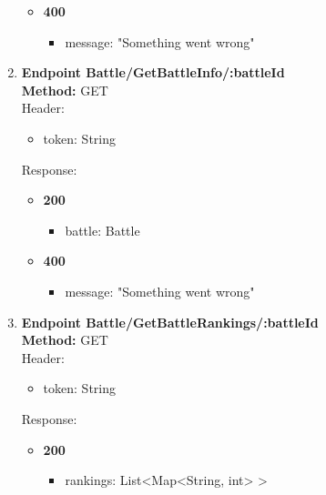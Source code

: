 \begin{enumerate}
\begin{itemize}
\begin{itemize}
        \end{itemize}
        \item \textbf{400} \\
        \begin{itemize}
            \item message: "Something went wrong"
        \end{itemize}
    \end{itemize}
    \item \textbf{Endpoint Battle/GetBattleInfo/:battleId} \\
    \textbf{Method:} GET \\
    Header:\\
    \begin{itemize}
        \item token: String
    \end{itemize}
    Response:\\
    \begin{itemize}
        \item \textbf{200} \\
        \begin{itemize}
            \item battle: Battle
        \end{itemize}
        \item \textbf{400} \\
        \begin{itemize}
            \item message: "Something went wrong"
        \end{itemize}
    \end{itemize}
    \item \textbf{Endpoint Battle/GetBattleRankings/:battleId} \\
    \textbf{Method:} GET \\
    Header:\\
    \begin{itemize}
        \item token: String
    \end{itemize}
    Response:\\
    \begin{itemize}
        \item \textbf{200} \\
        \begin{itemize}
            \item rankings: List<Map<String, int> >
        \end{itemize}

\end{itemize}
\end{enumerate}
